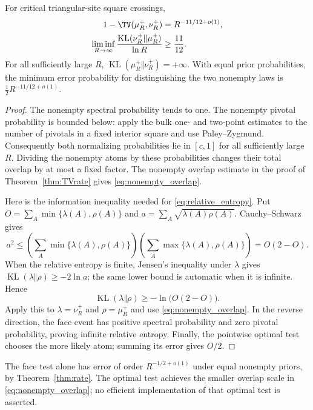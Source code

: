 \begin{corollary}\label{cor:testing}
For critical triangular-site square crossings,
\begin{align}
 1-\TV(\mu_R^+,\nu_R^+)&=R^{-11/12+o(1)},\label{eq:nonempty_overlap}\\
 \liminf_{R\to\infty}\frac{\operatorname{KL}(\nu_R^+\Vert\mu_R^+)}{\ln R}
 &\ge\frac{11}{12}.\label{eq:relative_entropy}
\end{align}
For all sufficiently large $R$, $\operatorname{KL}(\mu_R^+\Vert\nu_R^+)=+\infty$. With equal prior probabilities, the minimum error probability for distinguishing the two nonempty laws is $\frac12R^{-11/12+o(1)}$.
\end{corollary}
\begin{proof}
The nonempty spectral probability tends to one. The nonempty pivotal probability is bounded below: apply the bulk one- and two-point estimates to the number of pivotals in a fixed interior square and use Paley--Zygmund. Consequently both normalizing probabilities lie in $[c,1]$ for all sufficiently large $R$. Dividing the nonempty atoms by these probabilities changes their total overlap by at most a fixed factor. The nonempty overlap estimate in the proof of Theorem~\ref{thm:TVrate} gives \eqref{eq:nonempty_overlap}.

Here is the information inequality needed for \eqref{eq:relative_entropy}. Put $O=\sum_A\min\{\lambda(A),\rho(A)\}$ and $a=\sum_A\sqrt{\lambda(A)\rho(A)}$. Cauchy--Schwarz gives
\[
 a^2\le\left(\sum_A\min\{\lambda(A),\rho(A)\}\right)
 \left(\sum_A\max\{\lambda(A),\rho(A)\}\right)=O(2-O).
\]
When the relative entropy is finite, Jensen's inequality under $\lambda$ gives $\operatorname{KL}(\lambda\Vert\rho)\ge-2\ln a$; the same lower bound is automatic when it is infinite. Hence
\[
 \operatorname{KL}(\lambda\Vert\rho)\ge-\ln\bigl(O(2-O)\bigr).
\]
Apply this to $\lambda=\nu_R^+$ and $\rho=\mu_R^+$ and use \eqref{eq:nonempty_overlap}. In the reverse direction, the face event has positive spectral probability and zero pivotal probability, proving infinite relative entropy. Finally, the pointwise optimal test chooses the more likely atom; summing its error gives $O/2$.
\end{proof}

The face test alone has error of order $R^{-1/2+o(1)}$ under equal nonempty priors, by Theorem~\ref{thm:rate}. The optimal test achieves the smaller overlap scale in \eqref{eq:nonempty_overlap}; no efficient implementation of that optimal test is asserted.


